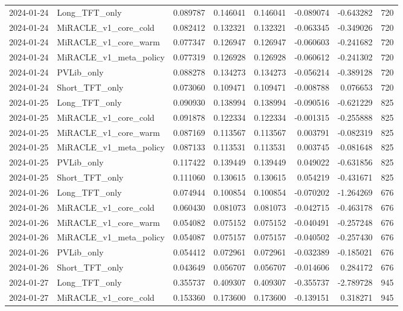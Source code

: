 \begin{tabular}{llrrrrrr}
2024-01-24 & Long_TFT_only & 0.089787 & 0.146041 & 0.146041 & -0.089074 & -0.643282 & 720 \\
2024-01-24 & MiRACLE_v1_core_cold & 0.082412 & 0.132321 & 0.132321 & -0.063345 & -0.349026 & 720 \\
2024-01-24 & MiRACLE_v1_core_warm & 0.077347 & 0.126947 & 0.126947 & -0.060603 & -0.241682 & 720 \\
2024-01-24 & MiRACLE_v1_meta_policy & 0.077319 & 0.126928 & 0.126928 & -0.060612 & -0.241302 & 720 \\
2024-01-24 & PVLib_only & 0.088278 & 0.134273 & 0.134273 & -0.056214 & -0.389128 & 720 \\
2024-01-24 & Short_TFT_only & 0.073060 & 0.109471 & 0.109471 & -0.008788 & 0.076653 & 720 \\
2024-01-25 & Long_TFT_only & 0.090930 & 0.138994 & 0.138994 & -0.090516 & -0.621229 & 825 \\
2024-01-25 & MiRACLE_v1_core_cold & 0.091878 & 0.122334 & 0.122334 & -0.001315 & -0.255888 & 825 \\
2024-01-25 & MiRACLE_v1_core_warm & 0.087169 & 0.113567 & 0.113567 & 0.003791 & -0.082319 & 825 \\
2024-01-25 & MiRACLE_v1_meta_policy & 0.087133 & 0.113531 & 0.113531 & 0.003745 & -0.081648 & 825 \\
2024-01-25 & PVLib_only & 0.117422 & 0.139449 & 0.139449 & 0.049022 & -0.631856 & 825 \\
2024-01-25 & Short_TFT_only & 0.111060 & 0.130615 & 0.130615 & 0.054219 & -0.431671 & 825 \\
2024-01-26 & Long_TFT_only & 0.074944 & 0.100854 & 0.100854 & -0.070202 & -1.264269 & 676 \\
2024-01-26 & MiRACLE_v1_core_cold & 0.060430 & 0.081073 & 0.081073 & -0.042715 & -0.463178 & 676 \\
2024-01-26 & MiRACLE_v1_core_warm & 0.054082 & 0.075152 & 0.075152 & -0.040491 & -0.257248 & 676 \\
2024-01-26 & MiRACLE_v1_meta_policy & 0.054087 & 0.075157 & 0.075157 & -0.040502 & -0.257430 & 676 \\
2024-01-26 & PVLib_only & 0.054412 & 0.072961 & 0.072961 & -0.032389 & -0.185021 & 676 \\
2024-01-26 & Short_TFT_only & 0.043649 & 0.056707 & 0.056707 & -0.014606 & 0.284172 & 676 \\
2024-01-27 & Long_TFT_only & 0.355737 & 0.409307 & 0.409307 & -0.355737 & -2.789728 & 945 \\
2024-01-27 & MiRACLE_v1_core_cold & 0.153360 & 0.173600 & 0.173600 & -0.139151 & 0.318271 & 945 \\

\end{tabular}
